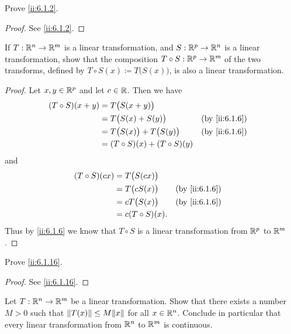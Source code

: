 \exercisesection

\begin{ex}\label{ii:ex:6.1.1}
  Prove \cref{ii:6.1.2}.
\end{ex}

\begin{proof}
  See \cref{ii:6.1.2}.
\end{proof}

\begin{ex}\label{ii:ex:6.1.2}
  If \(T : \mathbb{R}^n \to \mathbb{R}^m\) is a linear transformation, and \(S : \mathbb{R}^p \to \mathbb{R}^n\) is a linear transformation, show that the composition \(T \circ S : \mathbb{R}^p \to \mathbb{R}^m\) of the two transforms, defined by \(T \circ S(x) \coloneqq T\big(S(x)\big)\), is also a linear transformation.
\end{ex}

\begin{proof}
  Let \(x, y \in \mathbb{R}^p\) and let \(c \in \mathbb{R}\).
  Then we have
  \begin{align*}
    (T \circ S)(x + y) & = T\big(S(x + y)\big)                                  \\
                       & = T\big(S(x) + S(y)\big)            &  & \by{ii:6.1.6} \\
                       & = T\big(S(x)\big) + T\big(S(y)\big) &  & \by{ii:6.1.6} \\
                       & = (T \circ S)(x) + (T \circ S)(y)
  \end{align*}
  and
  \begin{align*}
    (T \circ S)(cx) & = T\big(S(cx)\big)                     \\
                    & = T\big(c S(x)\big) &  & \by{ii:6.1.6} \\
                    & = c T\big(S(x)\big) &  & \by{ii:6.1.6} \\
                    & = c (T \circ S)(x).
  \end{align*}
  Thus by \cref{ii:6.1.6} we know that \(T \circ S\) is a linear transformation from \(\mathbb{R}^p\) to \(\mathbb{R}^m\).
\end{proof}

\begin{ex}\label{ii:ex:6.1.3}
  Prove \cref{ii:6.1.16}.
\end{ex}

\begin{proof}
  See \cref{ii:6.1.16}.
\end{proof}

\begin{ex}\label{ii:ex:6.1.4}
  Let \(T : \mathbb{R}^n \to \mathbb{R}^m\) be a linear transformation.
  Show that there exists a number \(M > 0\) such that \(\norm*{T(x)} \leq M \norm*{x}\) for all \(x \in \mathbb{R}^n\).
  Conclude in particular that every linear transformation from \(\mathbb{R}^n\) to \(\mathbb{R}^m\) is continuous.
\end{ex}

